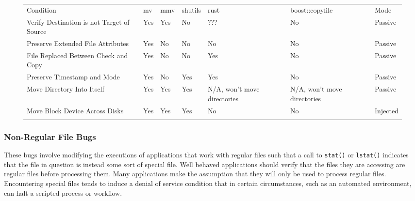\begin{figure*}[t]
                \scriptsize{}
                \begin{tabular}{l l l l l l | l}
                \toprule{}
                  Condition & mv & mmv & shutils & rust & boost::copyfile & Mode\\
                  Verify Destination is not Target of Source & Yes & Yes & No & ??? & No & Passive\\
                  Preserve Extended File Attributes & Yes & No & No & No & No & Passive\\
                  File Replaced Between Check and Copy & Yes & No & No & Yes & No & Passive\\
                  Preserve Timestamp and Mode & Yes & No & Yes & Yes & No & Passive\\
                  Move Directory Into Itself & Yes & Yes & Yes & N/A, won't move directories & N/A, won't move directories & Passive\\
                  Move Block Device Across Disks & Yes & Yes & Yes & No & No & Injected\\
                \bottomrule{}
                \end{tabular}
\end{figure*}

        \subsubsection{Non-Regular File Bugs}

        These bugs involve modifying the executions of applications that work with regular files such that a call to
        {\tt stat()} or {\tt lstat()} indicates that the file in question is instead some sort of special file.  Well behaved
        applications should verify that the files they are accessing are regular files before processing them.  Many
        applications make the assumption that they will only be used to process regular files.  Encountering special
        files tends to induce a denial of service condition that in certain circumstances, such as an automated
        environment, can halt a scripted process or workflow.


